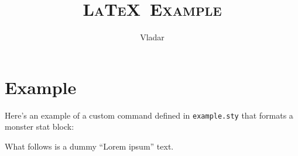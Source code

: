 \documentclass[10pt,twoside,twocolumn,openany]{book}
\title{\scshape\LaTeX~Example}
\author{Vladar}
\begin{document}
\maketitle

\chapter{Example}

Here's an example of a custom command defined in \verb|example.sty| that formats a monster stat block:


\vspace{\baselineskip}

What follows is a dummy ``Lorem ipsum'' text.

\lipsum[1-4]
\end{document}
